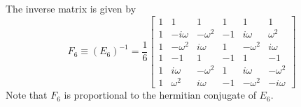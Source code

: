 The inverse matrix is given by
\begin{equation}
    F_{6} \equiv \left( E_{6} \right)^{-1} = \frac{1}{6} \begin{bmatrix}
        1 & 1 & 1 & 1 & 1 & 1 \\
        1 & -i\omega & -\omega^{2} & -1 & i\omega & \omega^{2} \\
        1 & -\omega^{2} & i\omega & 1 & -\omega^{2} & i\omega \\
        1 & -1 & 1 & -1 & 1 & -1 \\
        1 & i\omega & -\omega^{2} & 1 & i\omega & -\omega^{2} \\
        1 & \omega^{2} & i\omega & -1 & -\omega^{2} & -i\omega
    \end{bmatrix}
\end{equation}
Note that $F_{6}$ is proportional to the hermitian conjugate of $E_{6}$.